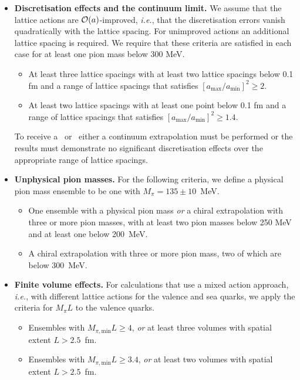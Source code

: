 \begin{itemize}
\item {\bfseries Discretisation effects and the continuum limit.} 
We assume that the lattice actions are ${\cal O}(a)$-improved, {\it i.e.}, 
that the discretisation errors vanish quadratically with the lattice spacing. 
%
For unimproved actions an additional lattice spacing is required. 
%
We require that these criteria are satisfied in each case for at least one 
pion mass below 300 MeV.
%
\begin{itemize}
%
\item[\bstar] At least three lattice spacings with at least two lattice 
spacings below 0.1 fm and a range of lattice spacings that satisfies 
$[a_{\mathrm{max}}/a_{\mathrm{min}}]^2 \geq 2$.
%
\item[\bcirc] At least two lattice spacings with at least one point below 
0.1 fm and a range of lattice spacings that satisfies 
$[a_{\mathrm{max}}/a_{\mathrm{min}}]^2 \geq 1.4$.
%
\end{itemize}
%
To receive a \bstar~or \bcirc~either a continuum extrapolation must be 
performed or the results must demonstrate no significant discretisation 
effects over the appropriate range of lattice spacings.

\item {\bfseries Unphysical pion masses.} 
For the following criteria, we define a physical pion mass ensemble 
to be one with $M_\pi=135\pm 10$~MeV.
%
\begin{itemize}
\item[\bstar] One ensemble with a physical pion mass \emph{or} a chiral 
extrapolation with three or more pion masses, with at least two pion masses 
below 250 MeV and at least one below 200~MeV.
%
\item[\bcirc] A chiral extrapolation with three or more pion mass, two of 
which are below 300~MeV.
%
\end{itemize}

\item {\bfseries Finite volume effects.} 
%
For calculations that use a mixed action approach, {\it i.e.},
with different lattice actions for the valence and sea quarks, 
we apply the criteria for $M_\pi L$ to the valence quarks.
%
\begin{itemize}
%
\item[\bstar] Ensembles with $M_{\pi,\mathrm{min}}L\geq 4$, \emph{or} at least 
three volumes with spatial extent $L>2.5$~fm.
\item[\bcirc] Ensembles with $M_{\pi,\mathrm{min}}L \geq 3.4$, \emph{or} at least 
two volumes with spatial extent $L>2.5$~fm.
\end{itemize}


\end{itemize}
